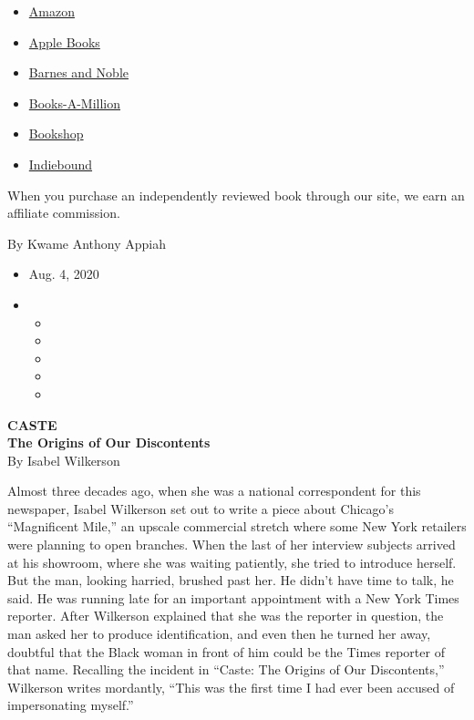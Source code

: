 \begin{itemize}
\tightlist
\item
  \href{https://www.amazon.com/gp/search?index=books\&tag=NYTBSREV-20\&field-keywords=Caste+Isabel+Wilkerson}{Amazon}
\item
  \href{https://du-gae-books-dot-nyt-du-prd.appspot.com/buy?title=Caste\&author=Isabel+Wilkerson}{Apple
  Books}
\item
  \href{https://www.anrdoezrs.net/click-7990613-11819508?url=https\%3A\%2F\%2Fwww.barnesandnoble.com\%2Fw\%2F\%3Fean\%3D9780593230251}{Barnes
  and Noble}
\item
  \href{https://www.anrdoezrs.net/click-7990613-35140?url=https\%3A\%2F\%2Fwww.booksamillion.com\%2Fp\%2FCaste\%2FIsabel\%2BWilkerson\%2F9780593230251}{Books-A-Million}
\item
  \href{https://bookshop.org/a/3546/9780593230251}{Bookshop}
\item
  \href{https://www.indiebound.org/book/9780593230251?aff=NYT}{Indiebound}
\end{itemize}

When you purchase an independently reviewed book through our site, we
earn an affiliate commission.

By Kwame Anthony Appiah

\begin{itemize}
\item
  Aug. 4, 2020
\item
  \begin{itemize}
  \item
  \item
  \item
  \item
  \item
  \end{itemize}
\end{itemize}

\textbf{CASTE}\\
\textbf{The Origins of Our Discontents}\\
By Isabel Wilkerson

Almost three decades ago, when she was a national correspondent for this
newspaper, Isabel Wilkerson set out to write a piece about Chicago's
``Magnificent Mile,'' an upscale commercial stretch where some New York
retailers were planning to open branches. When the last of her interview
subjects arrived at his showroom, where she was waiting patiently, she
tried to introduce herself. But the man, looking harried, brushed past
her. He didn't have time to talk, he said. He was running late for an
important appointment with a New York Times reporter. After Wilkerson
explained that she was the reporter in question, the man asked her to
produce identification, and even then he turned her away, doubtful that
the Black woman in front of him could be the Times reporter of that
name. Recalling the incident in ``Caste: The Origins of Our
Discontents,'' Wilkerson writes mordantly, ``This was the first time I
had ever been accused of impersonating myself.''

